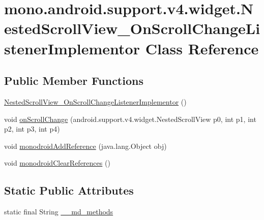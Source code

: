 \hypertarget{classmono_1_1android_1_1support_1_1v4_1_1widget_1_1_nested_scroll_view___on_scroll_change_listener_implementor}{
\section{mono.android.support.v4.widget.NestedScrollView\_\-OnScrollChangeListenerImplementor Class Reference}
\label{classmono_1_1android_1_1support_1_1v4_1_1widget_1_1_nested_scroll_view___on_scroll_change_listener_implementor}
}
\subsection*{Public Member Functions}
\begin{CompactItemize}
\item 
\hyperlink{classmono_1_1android_1_1support_1_1v4_1_1widget_1_1_nested_scroll_view___on_scroll_change_listener_implementor_ad965d1c3d725e65debb44f47e7cb779}{NestedScrollView\_\-OnScrollChangeListenerImplementor} ()
\item 
void \hyperlink{classmono_1_1android_1_1support_1_1v4_1_1widget_1_1_nested_scroll_view___on_scroll_change_listener_implementor_e77ca61884b43630951540c3040667fe}{onScrollChange} (android.support.v4.widget.NestedScrollView p0, int p1, int p2, int p3, int p4)
\item 
void \hyperlink{classmono_1_1android_1_1support_1_1v4_1_1widget_1_1_nested_scroll_view___on_scroll_change_listener_implementor_30cd540fd3bdbc6c89ff9ce53921ae1b}{monodroidAddReference} (java.lang.Object obj)
\item 
void \hyperlink{classmono_1_1android_1_1support_1_1v4_1_1widget_1_1_nested_scroll_view___on_scroll_change_listener_implementor_51ab24482a8e50779f3d45a756028aff}{monodroidClearReferences} ()
\end{CompactItemize}
\subsection*{Static Public Attributes}
\begin{CompactItemize}
\item 
static final String \hyperlink{classmono_1_1android_1_1support_1_1v4_1_1widget_1_1_nested_scroll_view___on_scroll_change_listener_implementor_ff89a2aa68d424dc98599788cbf43767}{\_\-\_\-md\_\-methods}
\end{CompactItemize}
